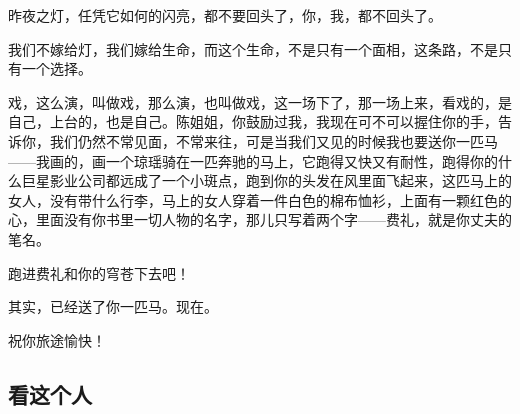 \par 昨夜之灯，任凭它如何的闪亮，都不要回头了，你，我，都不回头了。
\par 我们不嫁给灯，我们嫁给生命，而这个生命，不是只有一个面相，这条路，不是只有一个选择。
\par 戏，这么演，叫做戏，那么演，也叫做戏，这一场下了，那一场上来，看戏的，是自己，上台的，也是自己。陈姐姐，你鼓励过我，我现在可不可以握住你的手，告诉你，我们仍然不常见面，不常来往，可是当我们又见的时候我也要送你一匹马——我画的，画一个琼瑶骑在一匹奔驰的马上，它跑得又快又有耐性，跑得你的什么巨星影业公司都远成了一个小斑点，跑到你的头发在风里面飞起来，这匹马上的女人，没有带什么行李，马上的女人穿着一件白色的棉布恤衫，上面有一颗红色的心，里面没有你书里一切人物的名字，那儿只写着两个字——费礼，就是你丈夫的笔名。
\par 跑进费礼和你的穹苍下去吧！
\par 其实，已经送了你一匹马。现在。
\par 祝你旅途愉快！


\subsection{看这个人}


